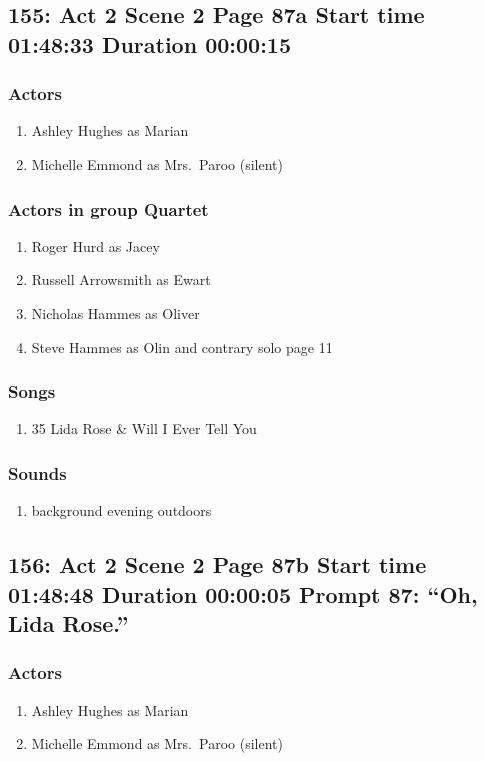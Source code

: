 \subsection{155: Act 2 Scene 2 Page 87a Start time 01:48:33 Duration 00:00:15}

\subsubsection{Actors}
\begin{enumerate}
\item Ashley Hughes as Marian
\item Michelle Emmond as Mrs.~Paroo (silent)
\end{enumerate}
\subsubsection{Actors in group Quartet}
\begin{enumerate}
\item Roger Hurd as Jacey
\item Russell Arrowsmith as Ewart
\item Nicholas Hammes as Oliver
\item Steve Hammes as Olin and contrary solo page 11
\end{enumerate}

\subsubsection{Songs}
\begin{enumerate}
\item 35 Lida Rose \& Will I Ever Tell You
\end{enumerate}\subsubsection{Sounds}
\begin{enumerate}
\item background evening outdoors
\end{enumerate}
\subsection{156: Act 2 Scene 2 Page 87b Start time 01:48:48 Duration 00:00:05 Prompt 87: ``Oh, Lida Rose.''}

\subsubsection{Actors}
\begin{enumerate}
\item Ashley Hughes as Marian
\item Michelle Emmond as Mrs.~Paroo (silent)
\end{enumerate}

